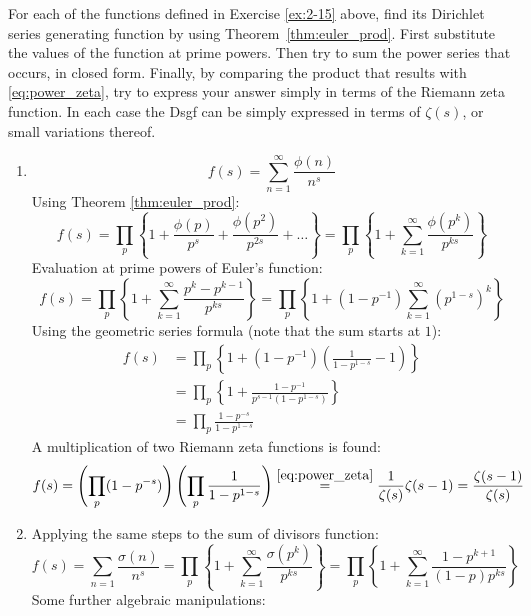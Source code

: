 \begin{exercise}
    \label{ex:2-16}
    For each of the functions defined in Exercise \ref{ex:2-15} above, find its Dirichlet series generating function by using Theorem~\ref{thm:euler_prod}. First substitute the values of the function at prime powers. Then try to sum the power series that occurs, in closed form. Finally, by comparing the product that results with \eqref{eq:power_zeta}, try to express your answer simply in terms of the Riemann zeta function. In each case the Dsgf can be simply expressed in terms of $\zeta(s)$, or small variations thereof.
\end{exercise}
\begin{solution}
    \begin{enumerate}[label=(\alph*)]
        \item \[
            f(s) = \sum_{n=1}^\infty \frac{\phi(n)}{n^s}
        \]
        Using Theorem \ref{thm:euler_prod}:
        \[
            f(s) = \prod_p \left\{1 + \frac{\phi(p)}{p^s} + \frac{\phi(p^2)}{p^{2s} } + \ldots \right\} = \prod_p \left\{1 + \sum_{k=1}^\infty \frac{\phi(p^k)}{p^{ks}}\right\}
        \]
        Evaluation at prime powers of Euler's function:
        \[
            f(s) = \prod_p \left\{1 + \sum_{k=1}^\infty \frac{p^k - p^{k-1}}{p^{ks}}  \right\} = \prod_p \left\{1 + (1-p^{-1})\sum_{k=1}^\infty (p^{1-s})^k \right\}
        \]
        Using the geometric series formula (note that the sum starts at $1$):
        \begin{align*}
            f(s) &= \prod_p \left\{1 + (1-p^{-1})\left(\frac{1}{1-p^{1-s}} - 1\right)\right\} \\
            &= \prod_p \left\{ 1 + \frac{1-p^{-1}}{p^{s-1}(1-p^{1-s})}\right\} \\
            &= \prod_p \frac{1-p^ {-s}}{1-p^{1-s}}
        \end{align*}
        A multiplication of two Riemann zeta functions is found:
        \[
            f(s) = \left(\prod_p (1-p^{-s})\right) \left(\prod_p \frac{1}{1-p^{1-s}} \right) \overset{\eqref{eq:power_zeta}}{=} \frac{1}{\zeta(s)} \zeta(s-1) = \frac{\zeta(s-1)}{\zeta(s)}
        \]
        \item Applying the same steps to the sum of divisors function:
        \[
            f(s) = \sum_{n=1} \frac{\sigma(n)}{n^s}= \prod_p \left\{1 + \sum_{k=1}^\infty \frac{\sigma(p^k)}{p^{ks}}\right\} = \prod_p \left\{1 + \sum_{k=1}^\infty \frac{1 - p^{k + 1}}{(1-p)p^{ks}} \right\}
        \]
        Some further algebraic manipulations:
        \begin{align*}

\end{align*}
\end{enumerate}
\end{solution}
